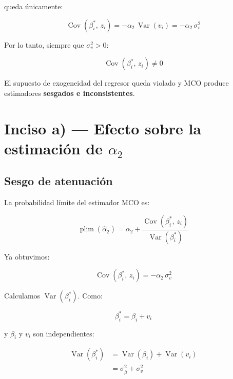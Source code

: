 \documentclass[12pt,letterpaper]{article}
\newcommand{\Var}{\operatorname{Var}}
\newcommand{\Cov}{\operatorname{Cov}}
\newcommand{\plim}{\operatorname{plim}}
\begin{document}
queda únicamente:

\begin{equation}
\boxed{
\Cov(\beta_{i}^{*},\, z_{i})
= -\alpha_{2}\,\Var(v_{i})
= -\alpha_{2}\,\sigma_{v}^{2}
}
\end{equation}

Por lo tanto, siempre que $\sigma_{v}^{2} > 0$:

\begin{equation}
\Cov(\beta_{i}^{*},\, z_{i}) \neq 0
\end{equation}

El supuesto de exogeneidad del regresor queda violado y MCO
produce estimadores \textbf{sesgados e inconsistentes}.

\section{Inciso a) --- Efecto sobre la estimación de $\alpha_{2}$}

\subsection{Sesgo de atenuación}

La probabilidad límite del estimador MCO es:

\begin{equation}
\plim(\hat{\alpha}_{2})
= \alpha_{2}
  + \frac{\Cov(\beta_{i}^{*},\, z_{i})}{\Var(\beta_{i}^{*})}
\end{equation}

Ya obtuvimos:

\begin{equation}
\Cov(\beta_{i}^{*},\, z_{i}) = -\alpha_{2}\,\sigma_{v}^{2}
\end{equation}

Calculamos $\Var(\beta_{i}^{*})$. Como:

\begin{equation}
\beta_{i}^{*} = \beta_{i} + v_{i}
\end{equation}

y $\beta_{i}$ y $v_{i}$ son independientes:

\begin{align}
\Var(\beta_{i}^{*})
&= \Var(\beta_{i}) + \Var(v_{i}) \\[4pt]
&= \sigma_{\beta}^{2} + \sigma_{v}^{2}
\end{align}
\end{document}
